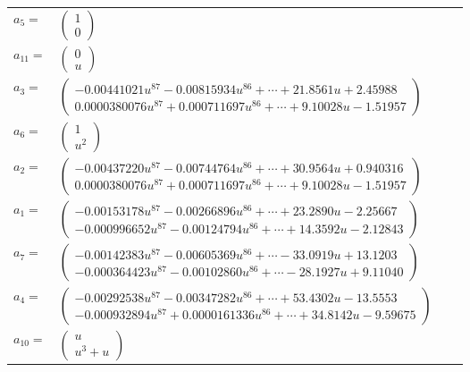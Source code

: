 \documentclass[1p]{elsarticle_modified}
\theoremstyle{definition}
\begin{document}
\begin{tabular}{m{7pt} m{180pt} m{7pt} m{180pt} }
\flushright $a_{5}=$&$\begin{pmatrix}1\\0\end{pmatrix}$ \\
\flushright $a_{11}=$&$\begin{pmatrix}0\\u\end{pmatrix}$ \\
\flushright $a_{3}=$&$\begin{pmatrix}-0.00441021 u^{87}-0.00815934 u^{86}+\cdots+21.8561 u+2.45988\\0.0000380076 u^{87}+0.000711697 u^{86}+\cdots+9.10028 u-1.51957\end{pmatrix}$ \\
\flushright $a_{6}=$&$\begin{pmatrix}1\\u^2\end{pmatrix}$ \\
\flushright $a_{2}=$&$\begin{pmatrix}-0.00437220 u^{87}-0.00744764 u^{86}+\cdots+30.9564 u+0.940316\\0.0000380076 u^{87}+0.000711697 u^{86}+\cdots+9.10028 u-1.51957\end{pmatrix}$ \\
\flushright $a_{1}=$&$\begin{pmatrix}-0.00153178 u^{87}-0.00266896 u^{86}+\cdots+23.2890 u-2.25667\\-0.000996652 u^{87}-0.00124794 u^{86}+\cdots+14.3592 u-2.12843\end{pmatrix}$ \\
\flushright $a_{7}=$&$\begin{pmatrix}-0.00142383 u^{87}-0.00605369 u^{86}+\cdots-33.0919 u+13.1203\\-0.000364423 u^{87}-0.00102860 u^{86}+\cdots-28.1927 u+9.11040\end{pmatrix}$ \\
\flushright $a_{4}=$&$\begin{pmatrix}-0.00292538 u^{87}-0.00347282 u^{86}+\cdots+53.4302 u-13.5553\\-0.000932894 u^{87}+0.0000161336 u^{86}+\cdots+34.8142 u-9.59675\end{pmatrix}$ \\
\flushright $a_{10}=$&$\begin{pmatrix}u\\u^3+u\end{pmatrix}$ \\

\end{tabular}
\end{document}

